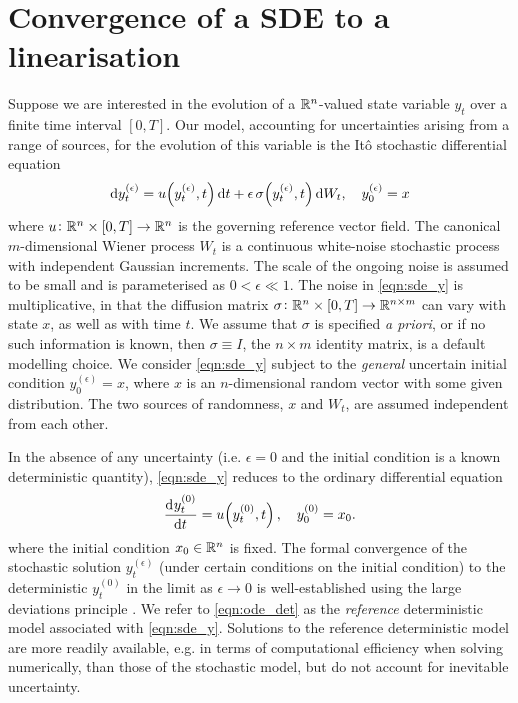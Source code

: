 \section{Convergence of a SDE to a linearisation}\label{sec:theory}
Suppose we are interested in the evolution of a \(\mathbb{R}^n\)-valued state variable \(y_t\) over a finite time interval \([0,T]\).
Our model, accounting for uncertainties arising from a range of sources, for the evolution of this variable is the It\^o stochastic differential equation
\begin{equation}
	\dif y_t^{(\epsilon)} = u\!\left(y_t^{(\epsilon)}, t\right)\dif t + \epsilon \, \sigma\!\left(y_t^{(\epsilon)}, t\right)\dif W_t, \quad y_0^{(\epsilon)} = x
	\label{eqn:sde_y}
\end{equation}
where \(u\colon \mathbb{R}^n \times [0,T] \to \mathbb{R}^n\) is the governing reference vector field.
The canonical \(m\)-dimensional Wiener process \(W_t\)  is a continuous white-noise stochastic process with independent Gaussian increments.
The scale of the ongoing noise is assumed to be small and is parameterised as \(0 < \epsilon \ll 1\).
The noise in \cref{eqn:sde_y} is multiplicative, in that the diffusion matrix \(\sigma\colon \mathbb{R}^n \times [0,T] \to \mathbb{R}^{n\times m}\) can vary with state \( x \), as well as with time \( t \).
We assume that \(\sigma\) is specified \textit{a priori}, or if no such information is known, then \(\sigma \equiv I\), the \(n \times m\) identity matrix, is a default modelling choice.
We consider \cref{eqn:sde_y} subject to the \emph{general} uncertain initial condition \(y_0^{(\epsilon)} = x\), where \(x\) is an \(n\)-dimensional random vector with some given distribution. The two sources of randomness, $ x $ and $ W_t $, are assumed independent from each other.

In the absence of any uncertainty (i.e. \(\epsilon = 0\) and the initial condition is a known deterministic quantity), \cref{eqn:sde_y} reduces to the ordinary differential equation
\begin{equation}
	\dod{y_t^{(0)}}{t} = u\!\left(y_t^{(0)}, t\right), \quad y_0^{(0)} = x_0.
	\label{eqn:ode_det}
\end{equation}
where the initial condition \(x_0 \in \mathbb{R}^n\) is fixed.
The formal convergence of the stochastic solution \(y_t^{(\epsilon)}\) (under certain conditions on the initial condition) to the deterministic \(y_{t}^{(0)}\) in the limit as \(\epsilon \to 0\) is well-established using the large deviations principle \cite[e.g]{FreidlinWentzell_1998_RandomPerturbationsDynamical}.
We refer to \cref{eqn:ode_det} as the \emph{reference} deterministic model associated with \cref{eqn:sde_y}.
Solutions to the reference deterministic model are more readily available, e.g. in terms of computational efficiency when solving numerically, than those of the stochastic model, but do not account for inevitable uncertainty.

